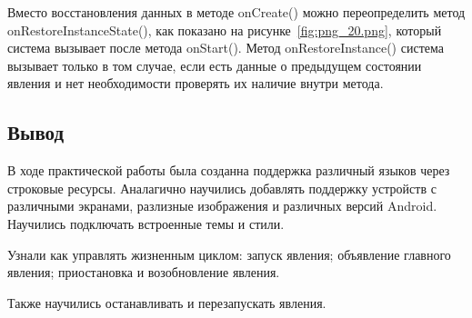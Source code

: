 Вместо восстановления данных в методе onCreate() можно
переопределить метод onRestoreInstanceState(), как показано
на рисунке~\ref{fig:png_20.png},
который система вызывает после метода onStart().
Метод onRestoreInstance() система вызывает только в
том случае, если есть данные о предыдущем состоянии явления и нет
необходимости проверять их наличие внутри метода.

\newpage

\subsection*{Вывод}
В ходе практической работы была созданна поддержка различный языков через
строковые ресурсы. Аналагично научились добавлять поддержку устройств с
различными экранами, разлизные изображения и различных версий Android.
Научились подключать встроенные темы и стили.\par
Узнали как управлять жизненным циклом: запуск явления; объявление
главного явления; приостановка и возобновление явления.\par
Также научились останавливать и перезапускать явления.

